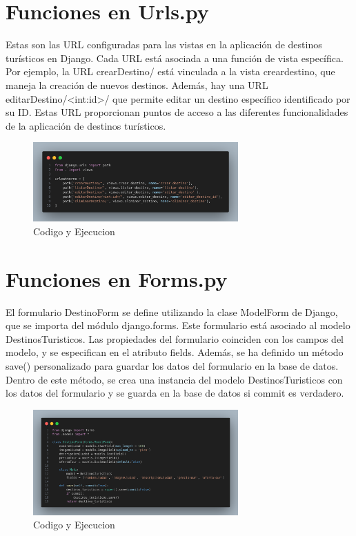 \documentclass[10pt, a4paper]{article}
\begin{document}
\section{Funciones en Urls.py}
Estas son las URL configuradas para las vistas en la aplicación de destinos turísticos en Django. Cada URL está asociada a una función de vista específica. Por ejemplo, la URL crearDestino/ está vinculada a la vista creardestino, que maneja la creación de nuevos destinos. Además, hay una URL editarDestino/<int:id>/ que permite editar un destino específico identificado por su ID. Estas URL proporcionan puntos de acceso a las diferentes funcionalidades de la aplicación de destinos turísticos.

\begin{figure}[H]
  \centering
  \includegraphics[width=0.7\textwidth]{img/urls-DestinosTuristicos.png}
  \caption{Codigo y Ejecucion}
\end{figure}

\section{Funciones en Forms.py}
El formulario DestinoForm se define utilizando la clase ModelForm de Django, que se importa del módulo django.forms. Este formulario está asociado al modelo DestinosTuristicos. Las propiedades del formulario coinciden con los campos del modelo, y se especifican en el atributo fields. Además, se ha definido un método save() personalizado para guardar los datos del formulario en la base de datos. Dentro de este método, se crea una instancia del modelo DestinosTuristicos con los datos del formulario y se guarda en la base de datos si commit es verdadero.

\begin{figure}[H]
  \centering
  \includegraphics[width=0.7\textwidth]{img/forms-DestinosTuristicos.png}
  \caption{Codigo y Ejecucion}
\end{figure}
\end{document}
